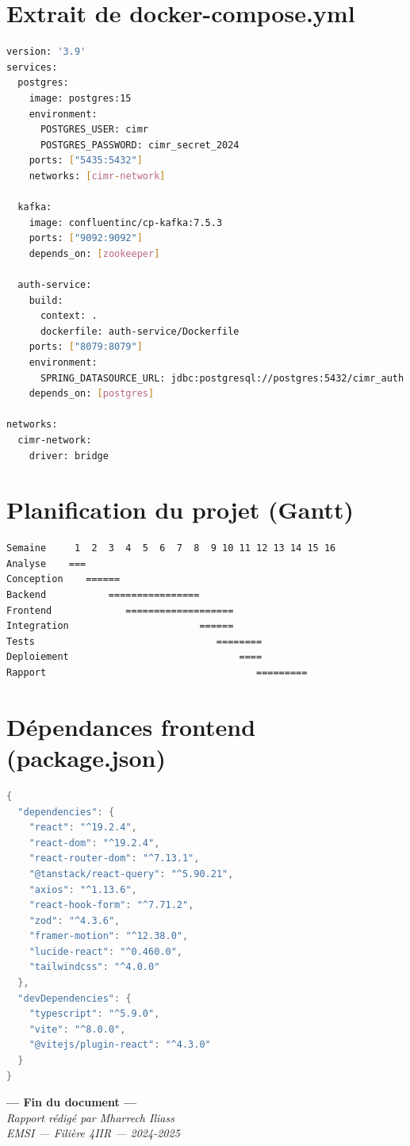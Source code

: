 \documentclass[12pt,a4paper,oneside]{report}
\begin{document}
\section{Extrait de docker-compose.yml}
\begin{lstlisting}[language=bash]
version: '3.9'
services:
  postgres:
    image: postgres:15
    environment:
      POSTGRES_USER: cimr
      POSTGRES_PASSWORD: cimr_secret_2024
    ports: ["5435:5432"]
    networks: [cimr-network]

  kafka:
    image: confluentinc/cp-kafka:7.5.3
    ports: ["9092:9092"]
    depends_on: [zookeeper]

  auth-service:
    build:
      context: .
      dockerfile: auth-service/Dockerfile
    ports: ["8079:8079"]
    environment:
      SPRING_DATASOURCE_URL: jdbc:postgresql://postgres:5432/cimr_auth
    depends_on: [postgres]

networks:
  cimr-network:
    driver: bridge
\end{lstlisting}

\section{Planification du projet (Gantt)}
\begin{lstlisting}
Semaine     1  2  3  4  5  6  7  8  9 10 11 12 13 14 15 16
Analyse    ===
Conception    ======
Backend           ================
Frontend             ===================
Integration                       ======
Tests                                ========
Deploiement                              ====
Rapport                                     =========
\end{lstlisting}

\section{Dépendances frontend (package.json)}
\begin{lstlisting}[language=Java]
{
  "dependencies": {
    "react": "^19.2.4",
    "react-dom": "^19.2.4",
    "react-router-dom": "^7.13.1",
    "@tanstack/react-query": "^5.90.21",
    "axios": "^1.13.6",
    "react-hook-form": "^7.71.2",
    "zod": "^4.3.6",
    "framer-motion": "^12.38.0",
    "lucide-react": "^0.460.0",
    "tailwindcss": "^4.0.0"
  },
  "devDependencies": {
    "typescript": "^5.9.0",
    "vite": "^8.0.0",
    "@vitejs/plugin-react": "^4.3.0"
  }
}
\end{lstlisting}



\vspace{2cm}
\begin{center}
\textbf{--- Fin du document ---}\\[0.5cm]
\textit{Rapport rédigé par Mharrech Iliass}\\
\textit{EMSI --- Filière 4IIR --- 2024-2025}
\end{center}
\end{document}
